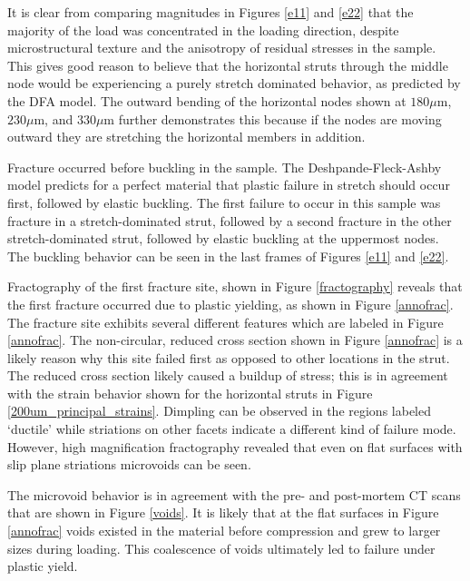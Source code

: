 It is clear from comparing magnitudes in Figures \ref{e11} and \ref{e22} that the majority of the load was concentrated in the loading direction, despite microstructural texture and the anisotropy of residual stresses in the sample. This gives good reason to believe that the horizontal struts through the middle node would be experiencing a purely stretch dominated behavior, as predicted by the DFA model. The outward bending of the horizontal nodes shown at $180\mu$m, $230 \mu$m, and $330\mu$m further demonstrates this because if the nodes are moving outward they are stretching the horizontal members in addition. 

Fracture occurred before buckling in the sample. The Deshpande-Fleck-Ashby model \cite{Deshpande2001} predicts for a perfect material that plastic failure in stretch should occur first, followed by elastic buckling. The first failure to occur in this sample was fracture in a stretch-dominated strut, followed by a second fracture in the other stretch-dominated strut, followed by elastic buckling at the uppermost nodes. The buckling behavior can be seen in the last frames of Figures \ref{e11} and \ref{e22}.

Fractography of the first fracture site, shown in Figure \ref{fractography} reveals that the first fracture occurred due to plastic yielding, as shown in Figure \ref{annofrac}. The fracture site exhibits several different features which are labeled in Figure \ref{annofrac}. The non-circular, reduced cross section shown in Figure \ref{annofrac} is a likely reason why this site failed first as opposed to other locations in the strut. The reduced cross section likely caused a buildup of stress; this is in agreement with the strain behavior shown for the horizontal struts in Figure \ref{200um_principal_strains}. Dimpling can be observed in the regions labeled `ductile' while striations on other facets indicate a different kind of failure mode. However, high magnification fractography revealed that even on flat surfaces with slip plane striations microvoids can be seen. 

The microvoid behavior is in agreement with the pre- and post-mortem CT scans that are shown in Figure \ref{voids}. It is likely that at the flat surfaces in Figure \ref{annofrac} voids existed in the material before compression and grew to larger sizes during loading. This coalescence of voids ultimately led to failure under plastic yield. 

